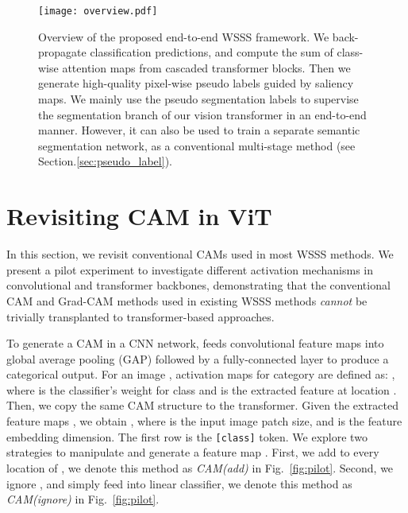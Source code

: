 \documentclass[10pt,twocolumn,letterpaper]{article}
\begin{document}
\begin{figure*}[!t]
   \begin{center}
   {\texttt{[image: overview.pdf]}} 
   \end{center}
\caption{
Overview of the proposed end-to-end WSSS framework.
We back-propagate classification predictions, and compute the sum of class-wise attention maps from cascaded transformer blocks. 
Then we generate high-quality pixel-wise pseudo labels guided by saliency maps. 
We mainly use the pseudo segmentation labels to supervise the segmentation branch of our vision transformer in an end-to-end manner.
However, it can also be used to train a separate semantic segmentation network, as a conventional multi-stage method (see Section.\ref{sec:pseudo_label}).
}
\label{fig:overview}
\end{figure*}


\section{Revisiting CAM in ViT}
\label{sections: pilot}
In this section, we revisit conventional CAMs \cite{ahn2018learning} used in most WSSS methods. 
We present a pilot experiment to investigate different activation mechanisms in convolutional and transformer backbones, demonstrating that the conventional CAM \cite{zhou2016learning} and Grad-CAM \cite{selvaraju2017grad} methods used in existing WSSS methods \textit{cannot} be trivially transplanted to transformer-based approaches.

To generate a CAM in a CNN network, \cite{zhou2016learning} feeds
convolutional feature maps  into global average pooling (GAP) followed by a fully-connected layer to produce a categorical output.
For an image , activation maps for category  are defined as:
, 
where  is the classifier's weight for class  and   is the extracted feature at location .
Then, we copy the same CAM structure to the transformer. 
Given the extracted feature maps , we obtain , where  is the input image patch size, and  is the feature embedding dimension. The first row  is the \texttt{[class]} token.
We explore two strategies to manipulate  and generate a feature map .
First, we add   to every location of  , we denote this method as \textit{CAM(add)} in Fig.~\ref{fig:pilot}.
Second, we ignore  , and simply feed  into linear classifier, we denote this method as \textit{CAM(ignore)} in Fig.~\ref{fig:pilot}.
\end{document}
